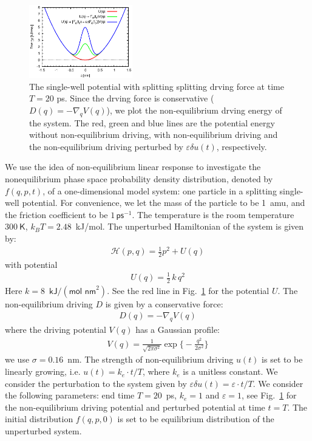 \documentclass[]{tMPH2e}
\newcommand{\mh}{\mathcal H}
\newcommand{\eps}{\varepsilon}
\begin{document}
\begin{figure}
  \centering
  \includegraphics[width=0.4\textwidth]{figs/fig-split-pot.eps}
  \caption{The single-well potential with splitting splitting drving
    force at time $T = 20$ ps.  Since the drving force is
    conservative ($ D( q) = -\nabla_{q}V( q)$),
    we plot the non-equilibrium drving energy of the system.  The red,
    green and blue lines are the potential energy without
    non-equilibrium driving, with non-equilibrium driving and
    the non-equilibrium driving perturbed by $\eps\delta u(t)$,
    respectively.  }
  \label{fig:tmp4}
\end{figure}

We use the idea of non-equilibrium linear response to investigate the
nonequilibrium phase space probability density distribution, denoted by $f(q, p, t)$, of a one-dimensional model system: one particle in a
splitting single-well potential.  For convenience, we let the mass of
the particle to be 1~\textsf{amu}, and the friction coefficient to be
$1\,\textsf{ps}^{-1}$.
The temperature is the
room temperature $300\ \textsf{K}$, $k_BT = 2.48$~\textsf{kJ/mol}.
The unperturbed Hamiltonian of the system is
given by:
\begin{align}
  \mh ( p,  q) = \frac 12  p^2 + U( q) 
\end{align}
with potential
\begin{align}
  U( q) = \frac12\,k\, q^2 
\end{align}
Here $k = 8$~$\textsf{kJ} / (\textsf{mol nm}^2)$.
See the red line in Fig.~\ref{fig:tmp4} for the  potential $U$.
The non-equilibrium driving $ D$ is given by a conservative force:
\begin{align}
   D( q) = -\nabla_{ q} V( q) 
\end{align}
where the driving potential $V( q)$ has a Gaussian profile:
\begin{align}
  V( q) = \frac{1}{\sqrt{2\pi \sigma^2}}
  \exp\Big\{-\frac{ q^2}{2\sigma^2}\Big\}
\end{align}
we use $\sigma = 0.16$~\textsf{nm}.  The strength of non-equilibrium
driving $u(t)$ is set to be linearly growing, i.e. $ u(t) = k_e\cdot t/T$,
where $k_e$ is a unitless constant.
We
consider the perturbation to the system given by $\eps\delta u(t) = \eps \cdot t/T$.
We consider the following parameters: end time $T = 20$~\textsf{ps}, 
$k_e = 1$ and $\eps = 1$, see Fig.~\ref{fig:tmp4}
for the non-equilibrium driving potential and perturbed
potential at time $t = T$. The initial distribution $f(q, p, 0)$ is set to
be equilibrium distribution of the unperturbed system.
\end{document}
